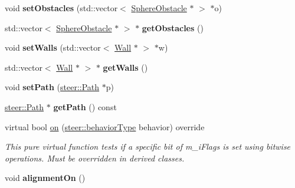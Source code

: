 \begin{DoxyCompactItemize}
\item 
\hypertarget{classsteer_1_1_super_component_ab5455f34959000eef1388e95784a9fa7}{void {\bfseries set\-Obstacles} (std\-::vector$<$ \hyperlink{classsteer_1_1_sphere_obstacle}{Sphere\-Obstacle} $\ast$ $>$ $\ast$o)}\label{classsteer_1_1_super_component_ab5455f34959000eef1388e95784a9fa7}

\item 
\hypertarget{classsteer_1_1_super_component_acd456febc86a0219468d1089479dc28e}{std\-::vector$<$ \hyperlink{classsteer_1_1_sphere_obstacle}{Sphere\-Obstacle} $\ast$ $>$ $\ast$ {\bfseries get\-Obstacles} ()}\label{classsteer_1_1_super_component_acd456febc86a0219468d1089479dc28e}

\item 
\hypertarget{classsteer_1_1_super_component_a8b708b58692f7aa2470869b8eb6662dc}{void {\bfseries set\-Walls} (std\-::vector$<$ \hyperlink{classsteer_1_1_wall}{Wall} $\ast$ $>$ $\ast$w)}\label{classsteer_1_1_super_component_a8b708b58692f7aa2470869b8eb6662dc}

\item 
\hypertarget{classsteer_1_1_super_component_a7b50fa401c00db5e8789dcece3e5f2df}{std\-::vector$<$ \hyperlink{classsteer_1_1_wall}{Wall} $\ast$ $>$ $\ast$ {\bfseries get\-Walls} ()}\label{classsteer_1_1_super_component_a7b50fa401c00db5e8789dcece3e5f2df}

\item 
\hypertarget{classsteer_1_1_super_component_a578bdae087432fc8da1a2d41e9050c43}{void {\bfseries set\-Path} (\hyperlink{classsteer_1_1_path}{steer\-::\-Path} $\ast$p)}\label{classsteer_1_1_super_component_a578bdae087432fc8da1a2d41e9050c43}

\item 
\hypertarget{classsteer_1_1_super_component_a9d3710528fcbcc4a20cfd3f03172e07e}{\hyperlink{classsteer_1_1_path}{steer\-::\-Path} $\ast$ {\bfseries get\-Path} () const }\label{classsteer_1_1_super_component_a9d3710528fcbcc4a20cfd3f03172e07e}

\item 
virtual bool \hyperlink{classsteer_1_1_super_component_a6d4b33b6f838d89216e11d8f2a427f58}{on} (\hyperlink{namespacesteer_afe6e72f8f8088962727051501181acbe}{steer\-::behavior\-Type} behavior) override
\begin{DoxyCompactList}\small\item\em This pure virtual function tests if a specific bit of m\-\_\-i\-Flags is set using bitwise operations. Must be overridden in derived classes. \end{DoxyCompactList}\item 
\hypertarget{classsteer_1_1_super_component_a95a9461aaa2c9d2ec66e2d39e982860f}{void {\bfseries alignment\-On} ()}\label{classsteer_1_1_super_component_a95a9461aaa2c9d2ec66e2d39e982860f}


\end{DoxyCompactItemize}
